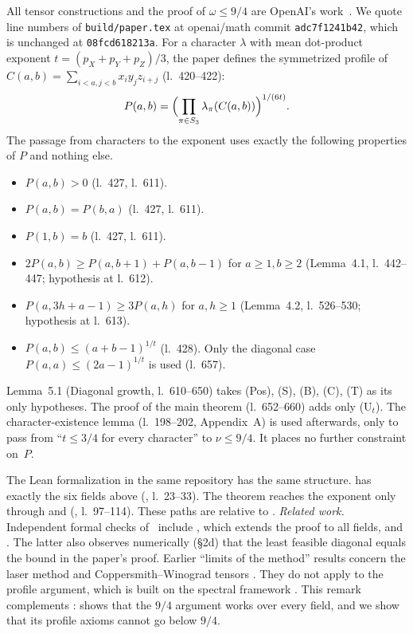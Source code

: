\documentclass[11pt]{amsart}
\theoremstyle{remark}
\begin{document}
All tensor constructions and the proof of $\omega\le 9/4$ are OpenAI's
work~\cite{OAI}. We quote line numbers of \texttt{build/paper.tex} at
openai/math commit \texttt{adc7f1241b42}, which is unchanged at
\texttt{08fcd618213a}. For a character $\lambda$ with mean dot-product
exponent $t=(p_X+p_Y+p_Z)/3$, the paper defines the symmetrized profile of
$C(a,b)=\sum_{i<a,j<b}x_iy_jz_{i+j}$ (l.~420--422):
\[
P(a,b)=\Bigl(\prod_{\pi\in S_3}\lambda_\pi(C(a,b))\Bigr)^{1/(6t)}.
\]
The passage from characters to the exponent uses exactly the following
properties of $P$ and nothing else.
\begin{itemize}
\item[(Pos)] $P(a,b)>0$ (l.~427, l.~611).
\item[(S)] $P(a,b)=P(b,a)$ (l.~427, l.~611).
\item[(B)] $P(1,b)=b$ (l.~427, l.~611).
\item[(C)] $2P(a,b)\ge P(a,b+1)+P(a,b-1)$ for $a\ge1,b\ge2$ (Lemma~4.1,
l.~442--447; hypothesis at l.~612).
\item[(T)] $P(a,3h+a-1)\ge 3P(a,h)$ for $a,h\ge1$ (Lemma~4.2, l.~526--530;
hypothesis at l.~613).
\item[(U$_t$)] $P(a,b)\le(a+b-1)^{1/t}$ (l.~428). Only the diagonal case
$P(a,a)\le(2a-1)^{1/t}$ is used (l.~657).
\end{itemize}
Lemma~5.1 (Diagonal growth, l.~610--650) takes (Pos), (S), (B), (C), (T) as
its only hypotheses. The proof of the main theorem (l.~652--660) adds only
(U$_t$). The character-existence lemma (l.~198--202, Appendix~A) is used
afterwards, only to pass from ``$t\le 3/4$ for every character'' to
$\nu\le 9/4$. It places no further constraint on~$P$.

The Lean formalization in the same repository has the same structure.
 has exactly the six fields above
(, l.~23--33). The theorem
 reaches the exponent only through
 and 
(, l.~97--114). These paths are relative
to .
\emph{Related work.} Independent formal checks of~\cite{OAI} include
\cite{SEL}, which extends the proof to all fields, and \cite{SVA}. The
latter also observes numerically (\S2d) that the least feasible diagonal
equals the bound in the paper's proof. Earlier ``limits of the method''
results concern the laser method and Coppersmith--Winograd tensors
\cite{AFLG,Alm,CVZb}. They do not apply to the profile argument, which is
built on the spectral framework \cite{Str88,CVZ,LG14}. This remark
complements \cite{SEL}: \cite{SEL} shows that the $9/4$ argument works over
every field, and we show that its profile axioms cannot go below $9/4$.
\end{document}
